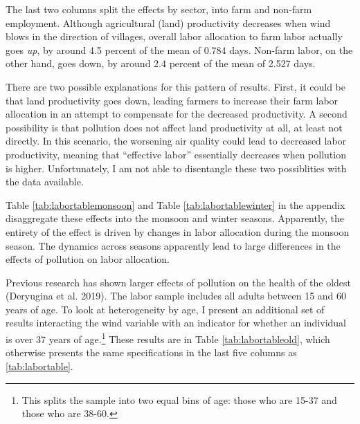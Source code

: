 \documentclass[
]{article}
\begin{document}
The last two columns split the effects by sector, into farm and non-farm employment. Although agricultural (land) productivity decreases when wind blows in the direction of villages, overall labor allocation to farm labor actually goes \emph{up}, by around 4.5 percent of the mean of 0.784 days. Non-farm labor, on the other hand, goes down, by around 2.4 percent of the mean of 2.527 days.

There are two possible explanations for this pattern of results. First, it could be that land productivity goes down, leading farmers to increase their farm labor allocation in an attempt to compensate for the decreased productivity. A second possibility is that pollution does not affect land productivity at all, at least not directly. In this scenario, the worsening air quality could lead to decreased labor productivity, meaning that ``effective labor'' essentially decreases when pollution is higher. Unfortunately, I am not able to disentangle these two possiblities with the data available.

Table \ref{tab:labortablemonsoon} and Table \ref{tab:labortablewinter} in the appendix disaggregate these effects into the monsoon and winter seasons. Apparently, the entirety of the effect is driven by changes in labor allocation during the monsoon season. The dynamics across seasons apparently lead to large differences in the effects of pollution on labor allocation.

Previous research has shown larger effects of pollution on the health of the oldest (Deryugina et al. 2019). The labor sample includes all adults between 15 and 60 years of age. To look at heterogeneity by age, I present an additional set of results interacting the wind variable with an indicator for whether an individual is over 37 years of age.\footnote{This splits the sample into two equal bins of age: those who are 15-37 and those who are 38-60.} These results are in Table \ref{tab:labortableold}, which otherwise presents the same specifications in the last five columns as \ref{tab:labortable}.
\end{document}
